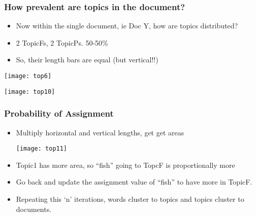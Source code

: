 \begin{frame}[fragile]\frametitle{How prevalent are topics in the document?}

  \begin{itemize}
  	\item Now within the single document, ie Doc Y, how are topics distributed?
	\item 2 TopicFs, 2 TopicPs. 50-50\%
	\item So, their length bars are equal (but vertical!!)
  \end{itemize}
\begin{center}
\texttt{[image: top6]}

\texttt{[image: top10]}
\end{center}


\end{frame}

\begin{frame}[fragile]\frametitle{Probability of Assignment }
  \begin{itemize}
	\item Multiply horizontal and vertical lengths, get get areas
	
\begin{center}
\texttt{[image: top11]}
\end{center}
\item Topic1 has more area, so ``fish'' going to TopcF is proportionally more
\item Go back and update the assignment value of ``fish'' to have more in TopicF. 
\item Repeating this `n' iterations, words cluster to topics and topics cluster to documents.
  \end{itemize}
  
\end{frame}


